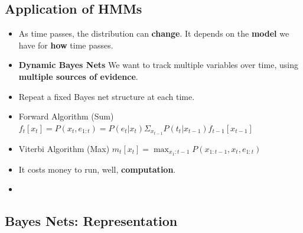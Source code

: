 \documentclass[twocolumn]{article}
\begin{document}
\subsection{Application of HMMs}
\label{sec:application-hmms}

\begin{itemize}
\item As time passes, the distribution can \textbf{change}. It depends
  on the \textbf{model} we have for \textbf{how} time passes.
\item \textbf{Dynamic Bayes Nets} We want to track multiple variables
  over time, using \textbf{multiple sources of evidence}.
\item Repeat a fixed Bayes net structure at each time.
\item Forward Algorithm (Sum)
  $f_{t}[x_{t}]=P(x_{t},e_{1:t})=P(e_{t}|x_{t})\Sigma_{x_{t-1}}P(t_{t}|x_{t-1})f_{t-1}[x_{t-1}]$ 
\item Viterbi Algorithm (Max)
  $m_{t}[x_{t}]=\max_{x_{1}:t-1}P(x_{1:t-1},x_{t},e_{1:t})$
\item It costs money to run, well, \textbf{computation}.
\item 
\end{itemize}


\subsection{Bayes Nets: Representation}
\label{sec:bayes-nets:-repr}
\end{document}
